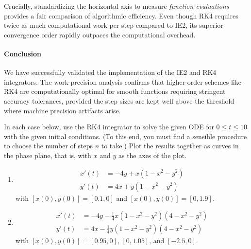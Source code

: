 \begin{solution}
	Crucially, standardizing the horizontal axis to measure \emph{function
		evaluations} provides a fair comparison of algorithmic efficiency. Even though
	RK4 requires twice as much computational work per step compared to IE2, its
	superior convergence order rapidly outpaces the computational overhead.

	\paragraph{Conclusion}
	We have successfully validated the implementation of the IE2 and RK4
	integrators. The work-precision analysis confirms that higher-order schemes like
	RK4 are computationally optimal for smooth functions requiring stringent
	accuracy tolerances, provided the step sizes are kept well above the threshold
	where machine precision artifacts arise.

\end{solution}

\begin{exercise}
	In each case below, use the RK4 integrator to solve the given ODE for $0\le
		t \le 10$ with the given initial conditions. (To this end, you must find a
	sensible procedure to choose the number of steps $n$ to take.) Plot the results
	together as curves in the phase plane, that is, with $x$ and $y$ as the axes of
	the plot.
	\begin{enumerate}
		\item
		      \begin{align*}
			      x'(t) & = - 4y + x(1-x^2-y^2) \\
			      y'(t) & = 4x + y(1-x^2-y^2)
		      \end{align*}
		      with $[x(0),y(0)]=[0.1,0]$ and $[x(0),y(0)]=[0,1.9]$.
		\item
		      \begin{align*}
			      x'(t) & = - 4y - \frac{1}{4}x(1-x^2-y^2)(4-x^2-y^2) \\
			      y'(t) & = 4x - \frac{1}{4}y(1-x^2-y^2)(4-x^2-y^2)
		      \end{align*}
		      with $[x(0),y(0)]=[0.95,0]$, $[0,1.05]$, and $[-2.5,0]$.
	\end{enumerate}
\end{exercise}

